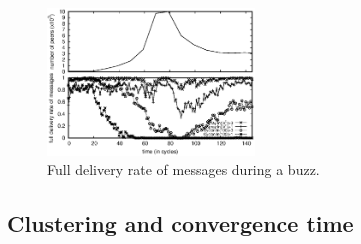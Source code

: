 \begin{figure}
  \begin{center}
    \includegraphics[width=0.49\textwidth]{img/peak.eps}
    \caption{\label{fig:peak}Full delivery rate of messages during a buzz.}
  \end{center}
\end{figure}



\subsection{Clustering and convergence time}

